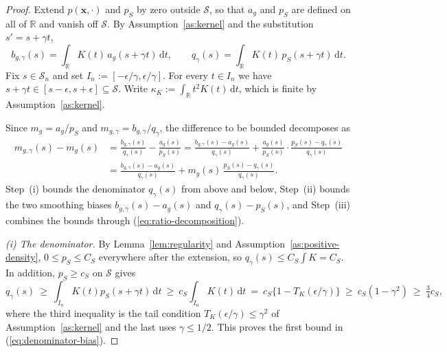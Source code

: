 \documentclass{article} %
\begin{document}
\begin{proof}
Extend $p(\mathbf{x},\cdot)$ and $p_S$ by zero outside $\mathcal{S}$, so that $a_g$ and $p_S$ are defined on all of $\mathbb{R}$ and vanish off $\mathcal{S}$.  By Assumption~\ref{as:kernel} and the substitution $s'=s+\gamma t$,
\begin{equation}
  b_{g,\gamma}(s)=\int_{\mathbb{R}}K(t)\,a_g(s+\gamma t)\,\mathrm{d}t,
  \qquad
  q_{\gamma}(s)=\int_{\mathbb{R}}K(t)\,p_S(s+\gamma t)\,\mathrm{d}t .
  \label{eq:change-of-variable}
\end{equation}
Fix $s\in\mathcal{S}_n$ and set $I_n:=[-\epsilon/\gamma,\epsilon/\gamma]$.  For every $t\in I_n$ we have $s+\gamma t\in[s-\epsilon,s+\epsilon]\subseteq\mathcal{S}$.  Write $\kappa_K:=\int_{\mathbb{R}}t^2K(t)\,\mathrm{d}t$, which is finite by Assumption~\ref{as:kernel}.

Since $m_g=a_g/p_S$ and $m_{g,\gamma}=b_{g,\gamma}/q_{\gamma}$, the difference to be bounded decomposes as
\begin{equation}
\begin{aligned}
  m_{g,\gamma}(s)-m_g(s)
  &=\frac{b_{g,\gamma}(s)}{q_{\gamma}(s)}-\frac{a_g(s)}{p_S(s)}
  =\frac{b_{g,\gamma}(s)-a_g(s)}{q_{\gamma}(s)}
   +\frac{a_g(s)}{p_S(s)}\cdot\frac{p_S(s)-q_{\gamma}(s)}{q_{\gamma}(s)}
  \\
  &=\frac{b_{g,\gamma}(s)-a_g(s)}{q_{\gamma}(s)}
   +m_g(s)\,\frac{p_S(s)-q_{\gamma}(s)}{q_{\gamma}(s)} .
\end{aligned}
  \label{eq:ratio-decomposition}
\end{equation}
  Step~(i) bounds the denominator $q_{\gamma}(s)$ from above and below, Step~(ii) bounds the two smoothing biases $b_{g,\gamma}(s)-a_g(s)$ and $q_{\gamma}(s)-p_S(s)$, and Step~(iii) combines the bounds through (\ref{eq:ratio-decomposition}).

\emph{(i) The denominator.}  By Lemma~\ref{lem:regularity} and Assumption~\ref{as:positive-density}, $0\le p_S\le C_S$ everywhere after the extension, so $q_{\gamma}(s)\le C_S\int K=C_S$.  In addition, $p_S\ge c_S$ on $\mathcal{S}$ gives
\[
  q_{\gamma}(s)\ \ge\ \int_{I_n}K(t)p_S(s+\gamma t)\,\mathrm{d}t
  \ \ge\ c_S\int_{I_n}K(t)\,\mathrm{d}t
  \ =\ c_S\{1-T_K(\epsilon/\gamma)\}
  \ \ge\ c_S(1-\gamma^2)\ \ge\ \tfrac{3}{4}c_S ,
\]
where the third inequality is the tail condition $T_K(\epsilon/\gamma)\le\gamma^2$ of Assumption~\ref{as:kernel} and the last uses $\gamma\le1/2$.  This proves the first bound in (\ref{eq:denominator-bias}).


\end{proof}
\end{document}
